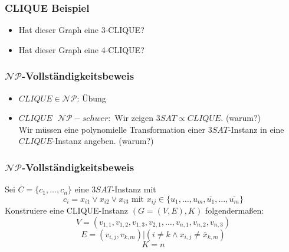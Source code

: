 \documentclass{beamer}
\begin{document}
{\begin{frame}
\frametitle{CLIQUE Beispiel}
\vspace{-1cm}
\begin{figure}[H]
\end{figure}
\begin{itemize}
\item Hat dieser Graph eine 3-CLIQUE?\pause
\item Hat dieser Graph eine 4-CLIQUE?
\end{itemize}
\end{frame}

\begin{frame}
\frametitle{$\mathcal{NP}$-Vollständigkeitsbeweis}
\begin{itemize}
 \item $CLIQUE \in \mathcal{NP}$: Übung\\
 \item $CLIQUE\mbox{ } \mathcal{NP}-schwer:$ Wir zeigen $3SAT \propto CLIQUE$. (warum?)\\\pause
 Wir müssen eine polynomielle Transformation einer $3SAT$-Instanz in eine $CLIQUE$-Instanz angeben. (warum?)\\
\end{itemize}
\end{frame}

\begin{frame}
\frametitle{$\mathcal{NP}$-Vollständigkeitsbeweis}
Sei $C = \{c_1, \ldots, c_n\}$ eine $3SAT$-Instanz mit 
$$ c_i = x_{i1} \vee x_{i2} \vee x_{i3} \mbox{ mit } x_{ij} \in \{u_1,\ldots,u_m,\bar{u_1},\ldots,\bar{u_m}\} $$
Konstruiere eine CLIQUE-Instanz $(G = (V, E), K)$ folgendermaßen:
$$V = (v_{1,1}, v_{1,2}, v_{1,3}, v_{2,1},\ldots,v_{n,1},v_{n,2},v_{n,3})$$
$$E = {(v_{i,j},v_{k,m})| (i \neq k \wedge x_{i,j} \neq \bar{x}_{k,m} )}$$%
$$K = n$$
\end{frame}

}
\end{document}
